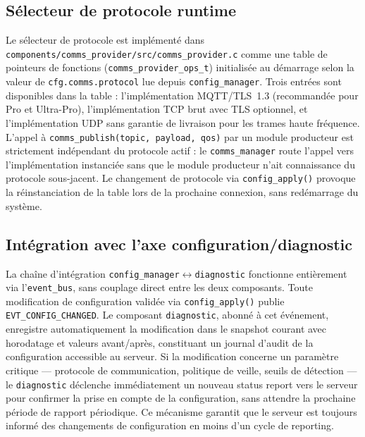 \subsection{Sélecteur de protocole runtime}
\label{subsec:proto_sel}

Le sélecteur de protocole est implémenté dans
\texttt{components/comms\_provider/src/comms\_provider.c} comme une
table de pointeurs de fonctions (\texttt{comms\_provider\_ops\_t})
initialisée au démarrage selon la valeur de \texttt{cfg.comms.protocol}
lue depuis \texttt{config\_manager}. Trois entrées sont disponibles
dans la table : l'implémentation MQTT/TLS~1.3 (recommandée pour Pro
et Ultra-Pro), l'implémentation TCP brut avec TLS optionnel, et
l'implémentation UDP sans garantie de livraison pour les trames haute
fréquence. L'appel à \texttt{comms\_publish(topic, payload, qos)}
par un module producteur est strictement indépendant du protocole
actif : le \texttt{comms\_manager} route l'appel vers l'implémentation
instanciée sans que le module producteur n'ait connaissance du protocole
sous-jacent. Le changement de protocole via \texttt{config\_apply()}
provoque la réinstanciation de la table lors de la prochaine connexion,
sans redémarrage du système.

\subsection{Intégration avec l'axe configuration/diagnostic}
\label{subsec:integ_cfg_diag}

La chaîne d'intégration \texttt{config\_manager}$\leftrightarrow$\texttt{diagnostic}
fonctionne entièrement via l'\texttt{event\_bus}, sans couplage
direct entre les deux composants. Toute modification de configuration
validée via \texttt{config\_apply()} publie \texttt{EVT\_CONFIG\_CHANGED}.
Le composant \texttt{diagnostic}, abonné à cet événement, enregistre
automatiquement la modification dans le snapshot courant avec
horodatage et valeurs avant/après, constituant un journal d'audit
de la configuration accessible au serveur. Si la modification concerne
un paramètre critique --- protocole de communication, politique de veille,
seuils de détection --- le \texttt{diagnostic} déclenche immédiatement
un nouveau status report vers le serveur pour confirmer la prise en
compte de la configuration, sans attendre la prochaine période de
rapport périodique. Ce mécanisme garantit que le serveur est toujours
informé des changements de configuration en moins d'un cycle de
reporting.

